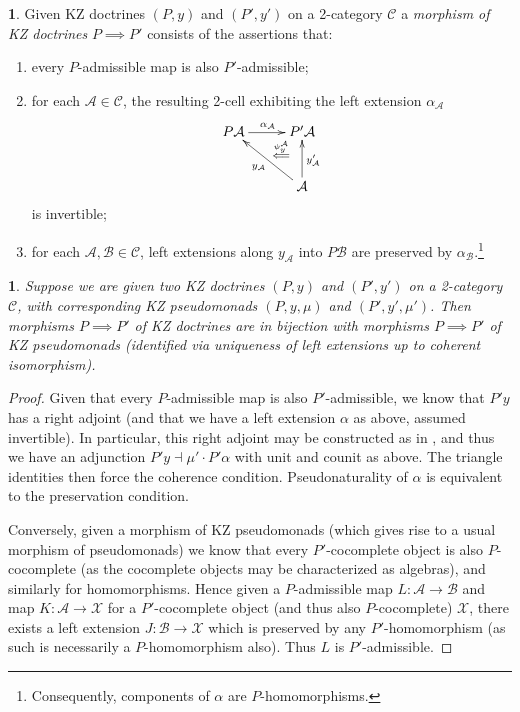\documentclass[a4paper,oneside,english]{amsart}
\numberwithin{equation}{section}
\numberwithin{figure}{section}
\theoremstyle{plain}
\theoremstyle{definition}
\newtheorem{defn}[thm]{\protect\definitionname}
\theoremstyle{remark}
\theoremstyle{definition}
\theoremstyle{plain}
\theoremstyle{plain}
\theoremstyle{plain}
\newtheorem{lem}[thm]{\protect\lemmaname}
\providecommand{\definitionname}{Definition}
\providecommand{\lemmaname}{Lemma}
\begin{document}
\begin{defn}
Given KZ doctrines $\left(P,y\right)$ and $\left(P',y'\right)$ on
a 2-category $\mathscr{C}$ a \emph{morphism of KZ doctrines} $P\implies P'$
consists of the assertions that: 
\begin{enumerate}
\item every $P$-admissible map is also $P'$-admissible;
\item for each $\mathcal{A}\in\mathscr{C}$, the resulting 2-cell exhibiting
the left extension $\alpha_{\mathcal{A}}$ 
\[
\xymatrix@=1em{P\mathcal{A}\ar[rr]^{\alpha_{\mathcal{A}}} &  & P'\mathcal{A}\\
 & \ar@{}[ur]|-{\overset{\psi_{y}^{\mathcal{A}}}{\Longleftarrow}}\\
 &  & \mathcal{A}\ar[uu]_{y'_{\mathcal{A}}}\ar[lluu]^{y_{\mathcal{A}}}
}
\]
is invertible;
\item for each $\mathcal{A},\mathcal{B}\in\mathscr{C}$, left extensions
along $y_{\mathcal{A}}$ into $P\mathcal{B}$ are preserved by $\alpha_{\mathcal{B}}$.\footnote{Consequently, components of $\alpha$ are $P$-homomorphisms.}
\end{enumerate}
\end{defn}
\begin{lem}
Suppose we are given two KZ doctrines $\left(P,y\right)$ and $\left(P',y'\right)$
on a 2-category $\mathscr{C}$, with corresponding KZ pseudomonads
$\left(P,y,\mu\right)$ and $\left(P',y',\mu'\right)$. Then morphisms
$P\implies P'$ of KZ doctrines are in bijection with morphisms $P\implies P'$
of KZ pseudomonads (identified via uniqueness of left extensions up
to coherent isomorphism).\end{lem}
\begin{proof}
Given that every $P$-admissible map is also $P'$-admissible, we
know that $P'y$ has a right adjoint (and that we have a left extension
$\alpha$ as above, assumed invertible). In particular, this right
adjoint may be constructed as in \cite[Prop. 15]{yonedakz}, and thus
we have an adjunction $P'y\dashv\mu'\cdot P'\alpha$ with unit and
counit as above. The triangle identities then force the coherence
condition. Pseudonaturality of $\alpha$ is equivalent to the preservation
condition.

Conversely, given a morphism of KZ pseudomonads (which gives rise
to a usual morphism of pseudomonads) we know that every $P'$-cocomplete
object is also $P$-cocomplete (as the cocomplete objects may be characterized
as algebras), and similarly for homomorphisms. Hence given a $P$-admissible
map $L\colon\mathcal{A}\to\mathcal{B}$ and map $K\colon\mathcal{A}\to\mathcal{X}$
for a $P'$-cocomplete object (and thus also $P$-cocomplete) $\mathcal{X}$,
there exists a left extension $J\colon\mathcal{B}\to\mathcal{X}$
which is preserved by any $P'$-homomorphism (as such is necessarily
a $P$-homomorphism also). Thus $L$ is $P'$-admissible.
\end{proof}
\end{document}
